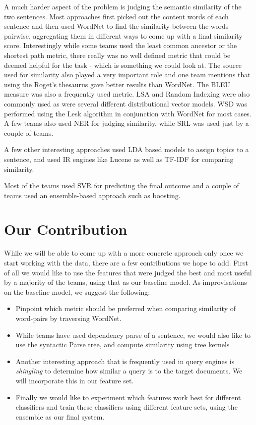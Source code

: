 \documentclass[11pt]{article}
\begin{document}
A much harder aspect of the problem is judging the semantic similarity of the two sentences. Most approaches first picked out the content words of each sentence and then used WordNet to find the similarity between the words pairwise, aggregating them in different ways to come up with a final similarity score. Interestingly while some teams used the least common ancestor or the shortest path metric, there really was no well defined metric that could be deemed helpful for the task - which is something we could look at.  The source used for similarity also played a very important role and one team mentions that using the Roget's thesaurus gave better results than WordNet. The BLEU measure was also a frequently used metric. LSA and Random Indexing were also commonly used as were several different distributional vector models. WSD was performed using the Lesk algorithm in conjunction with WordNet for most cases.  A few teams also used NER for judging similarity, while SRL was used just by a couple of teams. 

A few other interesting approaches used LDA based models to assign topics to a sentence, and used IR engines like Lucene as well as TF-IDF for comparing similarity. 

Most of the teams used SVR for predicting the final outcome and a couple of teams used an ensemble-based approach such as boosting.
\section{Our Contribution}
While we will be able to come up with a more concrete approach only once we start working with the data, there are a few contributions we hope to add. First of all we would like to use the features that were judged the best and most useful by a majority of the teams, using that as our baseline model. As improvisations on the baseline model, we suggest the following:
\begin{itemize}
\item Pinpoint which metric should be preferred when comparing similarity of word-pairs by traversing WordNet.
\item While teams have used dependency parse of a sentence, we would also like to use the syntactic Parse tree, and compute similarity using tree kernels
\item Another interesting approach that is frequently used in query engines is \emph{shingling} to determine how similar a query is to the target documents. We will incorporate this in our feature set.
\item Finally we would like to experiment which features work best for different classifiers and train these classifiers using different feature sets, using the ensemble as our final system.
\end{itemize} 
\end{document}
